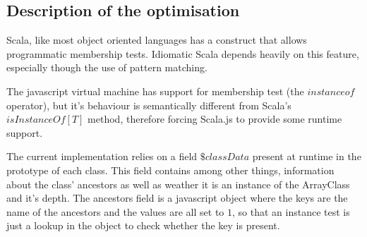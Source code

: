 \subsection{Description of the optimisation}

Scala, like most object oriented languages has a construct that allows
programmatic membership tests. Idiomatic Scala depends heavily on this feature,
especially though the use of pattern matching.

The javascript virtual machine has support for membership test (the
$instanceof$ operator), but it's behaviour is semantically different from
Scala's $isInstanceOf[T]$ method, therefore forcing Scala.js to provide some
runtime support.

The current implementation relies on a field $\$classData$ present at
runtime in the prototype of each class. This field contains among other things,
information about the class' ancestors as well as weather it is an instance of
the ArrayClass and it's depth. The ancestors field is a javascript object where
the keys are the name of the ancestors and the values are all set to $1$, so
that an instance test is just a lookup in the object to check whether the key
is present. 